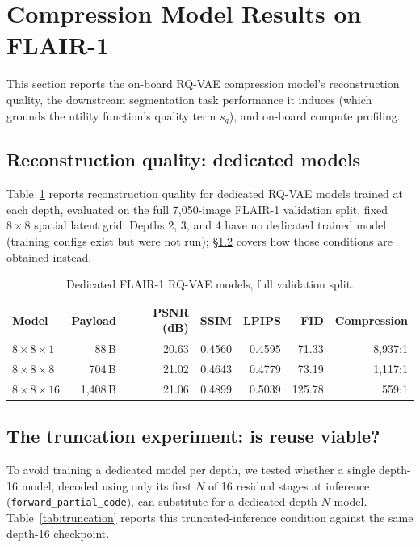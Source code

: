 \section{Compression Model Results on FLAIR-1}
\label{sec:compression}

This section reports the on-board RQ-VAE compression model's reconstruction
quality, the downstream segmentation task performance it induces (which
grounds the utility function's quality term $s_q$), and on-board compute
profiling.

\subsection{Reconstruction quality: dedicated models}

Table~\ref{tab:flair-dedicated} reports reconstruction quality for
dedicated RQ-VAE models trained at each depth, evaluated on the full
7{,}050-image FLAIR-1 validation split, fixed $8\times 8$ spatial latent grid.
Depths 2, 3, and 4 have no dedicated trained model (training configs exist
but were not run); \S\ref{sec:truncation} covers how those conditions are
obtained instead.

\begin{table}[h]
\centering
\caption{Dedicated FLAIR-1 RQ-VAE models, full validation split.}
\label{tab:flair-dedicated}
\begin{tabular}{lrrrrrr}
\toprule
Model & Payload & PSNR (dB) & SSIM & LPIPS & FID & Compression \\
\midrule
$8{\times}8{\times}1$  & 88\,B    & 20.63 & 0.4560 & 0.4595 & 71.33  & 8{,}937:1 \\
$8{\times}8{\times}8$  & 704\,B   & 21.02 & 0.4643 & 0.4779 & 73.19  & 1{,}117:1 \\
$8{\times}8{\times}16$ & 1{,}408\,B & 21.06 & 0.4899 & 0.5039 & 125.78 & 559:1 \\
\bottomrule
\end{tabular}
\end{table}

\subsection{The truncation experiment: is reuse viable?}
\label{sec:truncation}

To avoid training a dedicated model per depth, we tested whether a single
depth-16 model, decoded using only its first $N$ of 16 residual stages at
inference (\texttt{forward\_partial\_code}), can substitute for a dedicated
depth-$N$ model. Table~\ref{tab:truncation} reports this truncated-inference
condition against the same depth-16 checkpoint.

